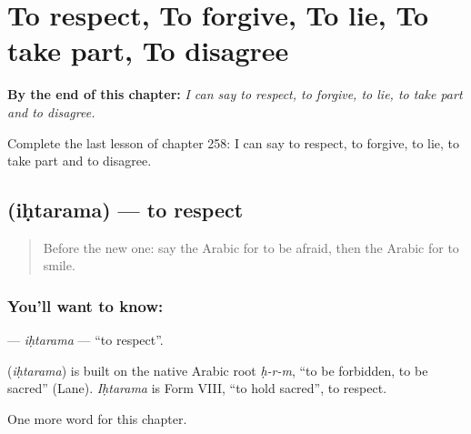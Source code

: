 
\chapter{To respect, To forgive, To lie, To take part, To disagree}
\label{ch:ar-to-respect-to-forgive-to-lie-to-take-part-to-disagree}

\begin{chapteropening}
\textbf{By the end of this chapter:} \emph{I can say to respect, to forgive, to lie, to take part and to disagree.}

Complete the last lesson of chapter 258: I can say to respect, to forgive, to lie, to take part and to disagree.
\end{chapteropening}

\section[\texorpdfstring{\ar{احترم} (iḥtarama)}{احترم (iḥtarama)}]{ (iḥtarama) — to respect}

\label{lesson:AR-C258-ihtarama}



\begin{quote}
Before the new one: say the Arabic for to be afraid, then the Arabic for to smile.
\end{quote}

\subsection*{You'll want to know: }
\textbf{} — \emph{iḥtarama} — \textquotedblleft{}to respect\textquotedblright{}.

\begin{cousinweb}
\textbf{} (\emph{iḥtarama}) is built on the native Arabic root \emph{ḥ-r-m}, \textquotedblleft{}to be forbidden, to be sacred\textquotedblright{} (Lane). \emph{Iḥtarama} is Form VIII, \textquotedblleft{}to hold sacred\textquotedblright{}, to respect.
\end{cousinweb}

\begin{grammarlens}[title={What you've built}]
One more word for this chapter.
\end{grammarlens}

